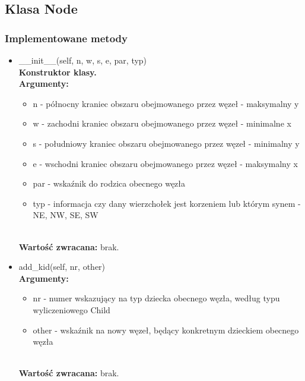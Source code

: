 \documentclass{article}
\begin{document}
        \subsection{Klasa Node}
            \subsubsection{Implementowane metody}
                \begin{itemize}
                    \item \_\_init\_\_(self, n, w, s, e, par, typ)\\
                        \textbf{Konstruktor klasy.} \\
                        \textbf{Argumenty:} \begin{itemize}
                                \item n - północny kraniec obszaru obejmowanego przez węzeł - maksymalny y
                                \item w - zachodni kraniec obszaru obejmowanego przez węzeł - minimalne x
                                \item s - południowy kraniec obszaru obejmowanego przez węzeł - minimalny y 
                                \item e - wschodni kraniec obszaru obejmowanego przez węzeł - maksymalny x 
                                \item par - wskaźnik do rodzica obecnego węzła 
                                \item typ - informacja czy dany wierzchołek jest korzeniem lub którym synem - NE, NW, SE, SW
                            \end{itemize}\\
                        \textbf{Wartość zwracana:} brak.
                        
                    \item add\_kid(self, nr, other)\\
                        \textbf{Argumenty:} \begin{itemize}
                                \item nr - numer wskazujący na typ dziecka obecnego węzła, według typu wyliczeniowego Child
                                \item other - wskaźnik na nowy węzeł, będący konkretnym dzieckiem obecnego węzła
                            \end{itemize}\\
                        \textbf{Wartość zwracana:} brak.
                    

\end{itemize}
\end{document}
